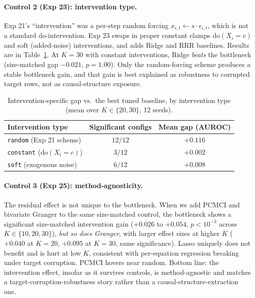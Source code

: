 \documentclass{article}
\begin{document}
\paragraph{Control 2 (Exp 23): intervention type.}
Exp 21's ``intervention'' was a per-step random forcing
$x_{i,t} \leftarrow s \cdot \epsilon_{i,t}$, which is not a standard
$\text{do}$-intervention. Exp 23 swaps in proper constant clamps
$\text{do}(X_i = c)$ and soft (added-noise) interventions, and adds
Ridge and RRR baselines. Results are in Table~\ref{tab:int_type}.
At $K=30$ with constant interventions, Ridge \emph{beats} the
bottleneck (size-matched gap $-0.021$, $p = 1.00$). Only the
random-forcing scheme produces a stable bottleneck gain, and that
gain is best explained as robustness to corrupted target rows, not
as causal-structure exposure.

\begin{table}[t]
\centering
\small
\caption{Intervention-specific gap vs.\ the best tuned baseline,
by intervention type (mean over $K \in \{20, 30\}$, 12 seeds).}
\label{tab:int_type}
\begin{tabular}{lcc}
\toprule
Intervention type & Significant configs & Mean gap (AUROC) \\
\midrule
\texttt{random} (Exp 21 scheme) & $12/12$ & $+0.116$ \\
\texttt{constant} ($\text{do}(X_i = c)$) & $3/12$ & $+0.002$ \\
\texttt{soft} (exogenous noise) & $6/12$ & $+0.008$ \\
\bottomrule
\end{tabular}
\end{table}

\paragraph{Control 3 (Exp 25): method-agnosticity.}
The residual effect is not unique to the bottleneck. When we add
PCMCI and bivariate Granger to the same size-matched control, the
bottleneck shows a significant size-matched intervention gain
($+0.026$ to $+0.054$, $p < 10^{-3}$ across $K \in \{10, 20, 30\}$),
\emph{but so does Granger}, with larger effect sizes at higher $K$
($+0.040$ at $K=20$, $+0.095$ at $K=30$, same significance).
Lasso uniquely does not benefit and is hurt at low $K$, consistent
with per-equation regression breaking under target corruption.
PCMCI hovers near random. Bottom line: the intervention effect,
insofar as it survives controls, is method-agnostic and matches a
target-corruption-robustness story rather than a
causal-structure-extraction one.
\end{document}
